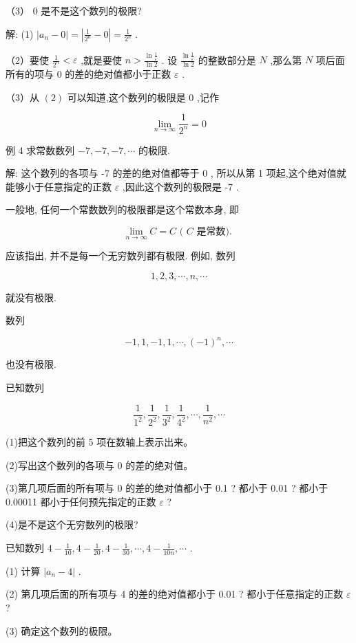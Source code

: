 \documentclass[lang=cn,newtx,10pt,scheme=chinese]{elegantbook}
\begin{document}
（3） 0 是不是这个数列的极限?

解: (1) \(\left| {{a}_{n} - 0}\right| = \left| {\frac{1}{{2}^{n}} - 0}\right| = \frac{1}{{2}^{n}}\) .

（2）要使 \(\frac{1}{{2}^{n}} < \varepsilon\) ,就是要使 \(n > \frac{\ln \frac{1}{\varepsilon }}{\ln 2}\) . 设 \(\frac{\ln \frac{1}{\varepsilon }}{\ln 2}\) 的整数部分是 \(N\) ,那么第 \(N\) 项后面所有的项与 0 的差的绝对值都小于正数 \(\varepsilon\) .

（3）从 \(\left( 2\right)\) 可以知道,这个数列的极限是 0 ,记作

\[
\mathop{\lim }\limits_{{n \rightarrow \infty }}\frac{1}{{2}^{n}} = 0
\]

例 4 求常数数列 \(- 7, - 7, - 7,\cdots\) 的极限.

解: 这个数列的各项与 -7 的差的绝对值都等于 0 , 所以从第 1 项起,这个绝对值就能够小于任意指定的正数 \(\varepsilon\) ,因此这个数列的极限是 -7 .

一般地, 任何一个常数数列的极限都是这个常数本身, 即

\[
\mathop{\lim }\limits_{{n \rightarrow \infty }}C = C\text{ ( }C\text{ 是常数). }
\]

应该指出, 并不是每一个无穷数列都有极限. 例如, 数列

\[
1,2,3,\cdots ,n,\cdots
\]

就没有极限.

数列

\[
- 1,1, - 1,1,\cdots ,{\left( -1\right) }^{n},\cdots
\]

也没有极限.

\begin{problemset}[练习]
	\item 已知数列
	
	\[
	\frac{1}{{1}^{2}},\frac{1}{{2}^{2}},\frac{1}{{3}^{2}},\frac{1}{{4}^{2}},\cdots ,\frac{1}{{n}^{2}},\cdots
	\]
	
	(1)把这个数列的前 5 项在数轴上表示出来。
	
	(2)写出这个数列的各项与 0 的差的绝对值。
	
	(3)第几项后面的所有项与 0 的差的绝对值都小于 0.1 ? 都小于 0.01 ? 都小于 0.00011 都小于任何预先指定的正数 \(\varepsilon\) ?
	
	(4)是不是这个无穷数列的极限?
	
	\item 已知数列 \(4 - \frac{1}{10},4 - \frac{1}{20},4 - \frac{1}{30},\cdots ,4 - \frac{1}{10n},\cdots\) .
	
	(1) 计算 \(\left| {{a}_{n} - 4}\right|\) .
	
	(2) 第几项后面的所有项与 4 的差的绝对值都小于 0.01 ? 都小于任意指定的正数 \(\varepsilon\) ?
	
	(3) 确定这个数列的极限。
\end{problemset}
\end{document}
